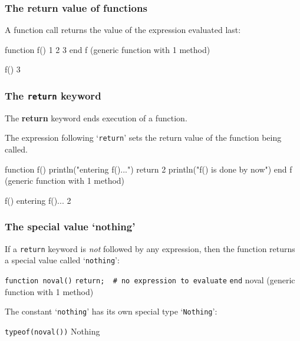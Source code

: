\documentclass[english,serif,mathserif,xcolor=pdftex,dvipsnames,table]{beamer}
\begin{document}


\begin{frame}[fragile]
  \frametitle{The return value of functions}
  A function call returns the value of the expression evaluated last:
\begin{semiverbatim}
\julia function f()
       1
       2
       3
       end
f (generic function with 1 method)

\julia f()
3
\end{semiverbatim}
\end{frame}

\begin{frame}[fragile]
  \frametitle{The \texttt{return} keyword}

  The {\ttfamily\bfseries return} keyword ends execution of a function.

  \+ The expression following `\texttt{return}' sets the return value
  of the function being called.

  \+
\begin{semiverbatim}
\julia function f()
       println("entering f()...")
       return 2
       println("f() is done by now")
       end
f (generic function with 1 method)

\julia f()
entering f()...
2
\end{semiverbatim}
\end{frame}


\begin{frame}[fragile]
  \frametitle{The special value `nothing'}
  If a \texttt{return} keyword is \emph{not} followed by any
  expression, then the function returns a special value called
  `\texttt{nothing}':
\begin{semiverbatim}
\julia \lstinline|function noval()|
       \lstinline|return;  # no expression to evaluate|
       \lstinline|end|
noval (generic function with 1 method)
\end{semiverbatim}

  \+ The constant `\texttt{nothing}' has its own special type `\texttt{Nothing}':
\begin{semiverbatim}
\julia \lstinline|typeof(noval())|
Nothing
\end{semiverbatim}
\end{frame}
\end{document}
